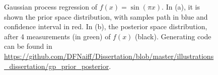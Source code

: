 \begin{figure}
	\centering
	
	\caption[Gaussian process regression of $f(x) = \sin(\pi x)$]{\label{gprfig}Gaussian process regression of $f(x) = \sin(\pi x)$. In (a), it is shown the prior space distribution, with samples path in blue and confidence interval in red. In (b), the posterior space distribution, after 4 measurements (in green) of $f(x)$ (black). Generating code can be found in \url{https://github.com/DFNaiff/Dissertation/blob/master/illustrations_dissertation/gp_prior_posterior}.}
\end{figure}


